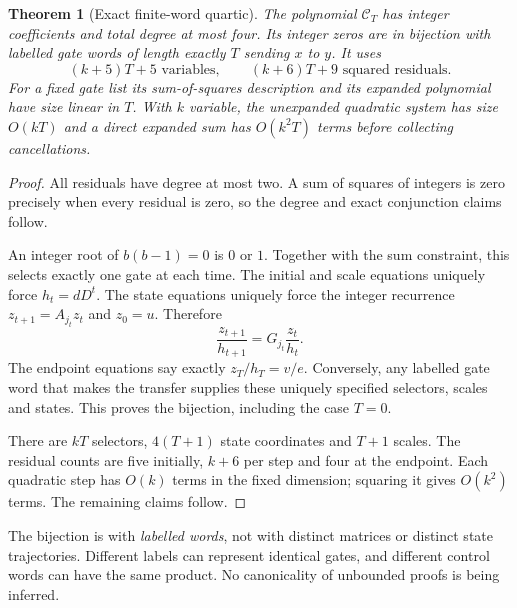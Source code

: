 \documentclass[11pt,letterpaper]{article}
\numberwithin{equation}{section}
\newtheorem{theorem}{Theorem}[section]
\theoremstyle{definition}
\theoremstyle{remark}
\begin{document}
\begin{theorem}[Exact finite-word quartic]\label{pqc:rr:thm:quartic}
The polynomial $\mathcal C_T$ has integer coefficients and total degree
at most four. Its integer zeros are in bijection with labelled gate
words of length exactly $T$ sending $x$ to $y$. It uses
\begin{equation}\label{pqc:rr:eq:certcounts}
 (k+5)T+5\text{ variables},\qquad (k+6)T+9\text{ squared residuals}.
\end{equation}
For a fixed gate list its sum-of-squares description and its expanded
polynomial have size linear in $T$. With $k$ variable, the unexpanded
quadratic system has size $O(kT)$ and a direct expanded sum has
$O(k^2T)$ terms before collecting cancellations.
\end{theorem}
\begin{proof}
All residuals have degree at most two. A sum of squares of integers is
zero precisely when every residual is zero, so the degree and exact
conjunction claims follow.

An integer root of $b(b-1)=0$ is $0$ or $1$. Together with the sum
constraint, this selects exactly one gate at each time. The initial and
scale equations uniquely force $h_t=dD^t$. The state equations uniquely
force the integer recurrence $z_{t+1}=A_{j_t}z_t$ and $z_0=u$.
Therefore
\[
 \frac{z_{t+1}}{h_{t+1}}
   =G_{j_t}\frac{z_t}{h_t}.
\]
The endpoint equations say exactly $z_T/h_T=v/e$. Conversely, any
labelled gate word that makes the transfer supplies these uniquely
specified selectors, scales and states. This proves the bijection,
including the case $T=0$.

There are $kT$ selectors, $4(T+1)$ state coordinates and $T+1$ scales.
The residual counts are five initially, $k+6$ per step and four at the
endpoint. Each quadratic step has $O(k)$ terms in the fixed dimension;
squaring it gives $O(k^2)$ terms. The remaining claims follow.
\end{proof}

The bijection is with \emph{labelled words}, not with distinct matrices
or distinct state trajectories. Different labels can represent identical
gates, and different control words can have the same product. No
canonicality of unbounded proofs is being inferred.
\end{document}
